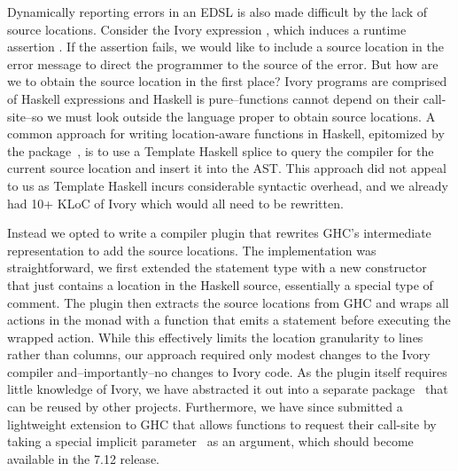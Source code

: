 Dynamically reporting errors in an EDSL is also made difficult by the lack of
source locations. Consider the Ivory expression \hbox{,} which induces a
runtime assertion . If the assertion fails, we would like to include
a source location in the error message to direct the programmer to the source of
the error. But how are we to obtain the source location in the first place?
Ivory programs are comprised of Haskell expressions and Haskell is
pure--functions cannot depend on their call-site--so we must look outside the
language proper to obtain source locations. A common approach for writing
location-aware functions in Haskell, epitomized by the 
package~\cite{file-location}, is to use a Template Haskell splice to query the
compiler for the current source location and insert it into the AST. This
approach did not appeal to us as Template Haskell incurs considerable syntactic
overhead, and we already had 10+ KLoC of Ivory which would all need to be
rewritten.

Instead we opted to write a compiler plugin that rewrites GHC's intermediate
representation to add the source locations. The implementation was
straightforward, we first extended the  statement type with a new
 constructor that just contains a location in the Haskell source,
essentially a special type of comment. The plugin then extracts the source
locations from GHC and wraps all actions in the  monad with a
 function that emits a  statement before executing
the wrapped action. While this effectively limits the location granularity to
lines rather than columns, our approach required only modest changes to the
Ivory compiler and--importantly--no changes to Ivory code. As the plugin
itself requires little knowledge of Ivory, we have abstracted it out into a
separate package~\cite{ghc-srcspan-plugin} that can be reused by other projects.
Furthermore, we have since submitted a lightweight extension to GHC that allows
functions to request their call-site by taking a special implicit
parameter~\cite{lewis2000implicit} as an argument, which should become available
in the 7.12 release.


